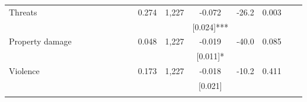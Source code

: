 \begin{tabular}{lcccccccccccccc}
\quad Threats \phantom{} &  &  &  &  &  &  &  & 0.274 & 1,227 & -0.072 & -26.2 & 0.003 &  & \\
 &  &  &  &  &  &  &  &  &  & [0.024]*** &  &  &  & \\
\quad Property damage \phantom{} &  &  &  &  &  &  &  & 0.048 & 1,227 & -0.019 & -40.0 & 0.085 &  & \\
 &  &  &  &  &  &  &  &  &  & [0.011]* &  &  &  & \\
\quad Violence \phantom{} &  &  &  &  &  &  &  & 0.173 & 1,227 & -0.018 & -10.2 & 0.411 &  & \\
 &  &  &  &  &  &  &  &  &  & [0.021] &  &  &  & \\
\noalign{\smallskip}\hline\end{tabular}

